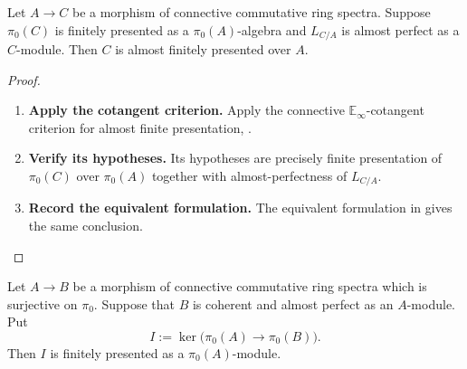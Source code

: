 \begin{corollary}
\label{cor:cotangent-almost-finite-general}
Let \(A\to C\) be a morphism of connective commutative ring spectra. Suppose
\(\pi_0(C)\) is finitely presented as a \(\pi_0(A)\)-algebra and
\(L_{C/A}\) is almost perfect as a \(C\)-module. Then \(C\) is almost
finitely presented over \(A\).
\end{corollary}

\begin{proof}
\leavevmode
\begin{enumerate}[label=\textup{(\arabic*)}]
    \item \textbf{Apply the cotangent criterion.}
    Apply the connective \(\mathbb E_\infty\)-cotangent criterion for almost
    finite presentation,
    \cite[Theorem~2.12(2)]{LurieDAGIV}.
    \item \textbf{Verify its hypotheses.}
    Its hypotheses are precisely finite
    presentation of \(\pi_0(C)\) over \(\pi_0(A)\) together with
    almost-perfectness of \(L_{C/A}\).
    \item \textbf{Record the equivalent formulation.}
    The equivalent formulation in
    \cite[Proposition~A.19(1)--(2)]{BrantnerMagidsonNuiten} gives the same
    conclusion.
\end{enumerate}
\end{proof}

\begin{lemma}
\label{lem:augmentation-kernel-finitely-presented}
Let \(A\to B\) be a morphism of connective commutative ring spectra which is
surjective on \(\pi_0\). Suppose that \(B\) is coherent and almost perfect as
an \(A\)-module. Put
\[
    I:=\ker\bigl(\pi_0(A)\to\pi_0(B)\bigr).
\]
Then \(I\) is finitely presented as a \(\pi_0(A)\)-module.
\end{lemma}

